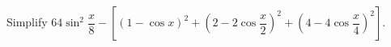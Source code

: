 Simplify $64\sin^2\dfrac{x}{8}-\left[(1-\cos x)^2+(2-2\cos\dfrac{x}{2})^2+(4-4\cos\dfrac{x}{4})^2\right]$.

